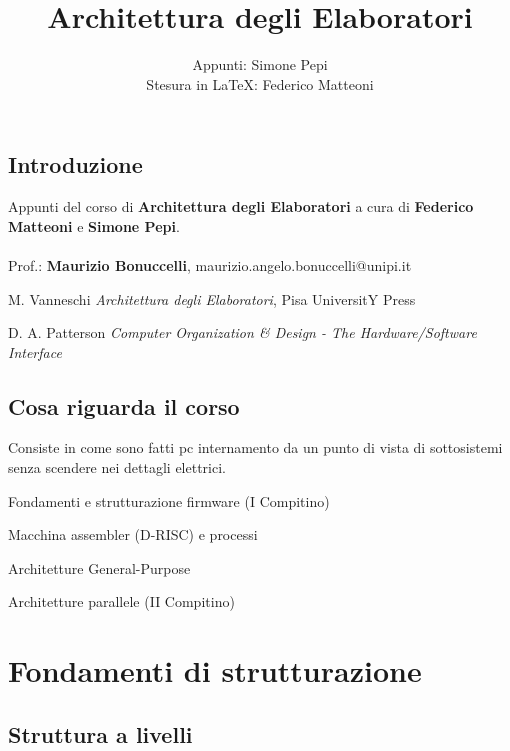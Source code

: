 \documentclass[10pt]{report}
\begin{document}
\title{Architettura degli Elaboratori}
\author{Appunti: Simone Pepi\\Stesura in \LaTeX: Federico Matteoni}
\date{ }
\renewcommand*\contentsname{Indice}

\maketitle
\begin{multicols}{2}
\tableofcontents
\end{multicols}
\pagebreak
\section{Introduzione}
Appunti del corso di \textbf{Architettura degli Elaboratori} a cura di \textbf{Federico Matteoni} e \textbf{Simone Pepi}.\\\\
Prof.: \textbf{Maurizio Bonuccelli}, maurizio.angelo.bonuccelli@unipi.it\\
\begin{list}{-}{Libri}
\item  M. Vanneschi \textit{Architettura degli Elaboratori}, Pisa UniversitY Press
\item D. A. Patterson \textit{Computer Organization \& Design - The Hardware/Software Interface}
\end{list}
\section{Cosa riguarda il corso}
Consiste in come sono fatti pc internamento da un punto di vista di sottosistemi senza scendere nei dettagli elettrici.
\begin{list}{-}{Il corso è diviso in quattro parti:}
\item Fondamenti e strutturazione firmware (I Compitino)
\item Macchina assembler (D-RISC) e processi
\item Architetture General-Purpose
\item Architetture parallele (II Compitino)
\end{list}
\chapter{Fondamenti di strutturazione}
\section{Struttura a livelli}
\end{document}
